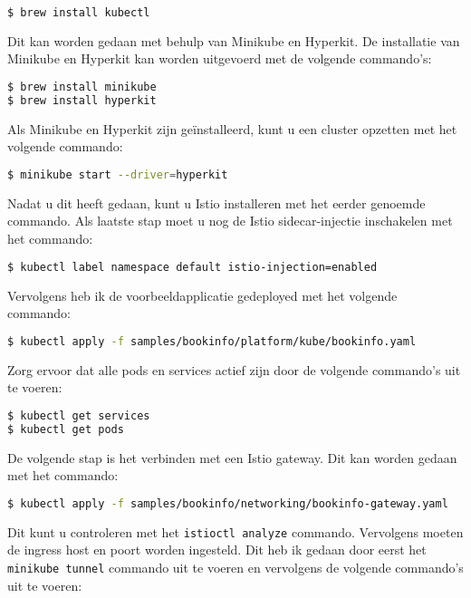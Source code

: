 \begin{lstlisting}[language=bash]
$ brew install kubectl
\end{lstlisting}

Dit kan worden gedaan met behulp van Minikube en Hyperkit. De installatie van Minikube en Hyperkit kan worden uitgevoerd met de volgende commando's:

\begin{lstlisting}[language=bash]
$ brew install minikube
$ brew install hyperkit
\end{lstlisting}

Als Minikube en Hyperkit zijn geïnstalleerd, kunt u een cluster opzetten met het volgende commando:

\begin{lstlisting}[language=bash]
$ minikube start --driver=hyperkit
\end{lstlisting}

Nadat u dit heeft gedaan, kunt u Istio installeren met het eerder genoemde commando. Als laatste stap moet u nog de Istio sidecar-injectie inschakelen met het commando:

\begin{lstlisting}[language=bash]
$ kubectl label namespace default istio-injection=enabled
\end{lstlisting}

Vervolgens heb ik de voorbeeldapplicatie gedeployed met het volgende commando:

\begin{lstlisting}[language=bash]
$ kubectl apply -f samples/bookinfo/platform/kube/bookinfo.yaml
\end{lstlisting}

Zorg ervoor dat alle pods en services actief zijn door de volgende commando's uit te voeren:

\begin{lstlisting}[language=bash]
$ kubectl get services
$ kubectl get pods
\end{lstlisting}

De volgende stap is het verbinden met een Istio gateway. Dit kan worden gedaan met het commando:

\begin{lstlisting}[language=bash]
$ kubectl apply -f samples/bookinfo/networking/bookinfo-gateway.yaml
\end{lstlisting}

Dit kunt u controleren met het \verb|istioctl analyze| commando. Vervolgens moeten de ingress host en poort worden ingesteld. Dit heb ik gedaan door eerst het \verb|minikube tunnel| commando uit te voeren en vervolgens de volgende commando's uit te voeren:

